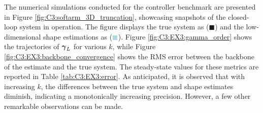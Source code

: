 The numerical simulations conducted for the controller benchmark are presented in Figure \ref{fig:C3:softarm_3D_truncation}, showcasing snapshots of the closed-loop system in operation. The figure displays the true system as (\textcolor{matinfil!50}{$\blacksquare$}) and the low-dimensional shape estimations as (\textcolor{lightblue}{$\blacksquare$}). Figure \ref{fig:C3:EX3:gamma_order} shows the trajectories of ${\boldsymbol{\gamma}}_L$ for various $k$, while Figure \ref{fig:C3:EX3:backbone_convergence} shows the RMS error between the backbone of the estimate and the true system. The steady-state values for these metrics are reported in Table \ref{tab:C3:EX3:error}. As anticipated, it is observed that with increasing $k$, the differences between the true system and shape estimates diminish, indicating a monotonically increasing precision. However, a few other remarkable observations can be made.

